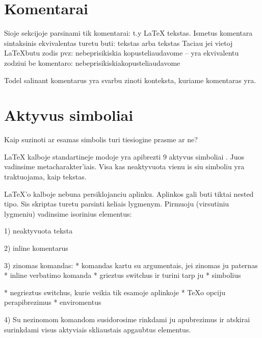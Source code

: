 \documentclass{article}
\begin{document}
\section{Komentarai}
Sioje sekcijoje parsinami tik komentarai:
t.y \LaTeX%
   tekstas. Ismetus komentara sintaksinis ekvivalentas turetu buti: \LateX tekstas arba \LateX{}tekstas  
Taciau jei vietoj \LaTeX butu zodis pvz: nebeprisikiskia%
          kopusteliaudavome -- yra ekvivalentu zodziui be komentaro: nebeprisikiskiakopusteliaudavome

Todel salinant komentarus yra svarbu zinoti konteksta, kuriame komentaras yra. 

\section{Aktyvus simboliai}
Kaip suzinoti ar esamas simbolis turi tiesiogine prasme ar ne?

LaTeX kalboje standartineje modoje yra apibrezti 9
aktyvus simboliai %
. Juos vadinsime metacharakter'iais. Visa kas neaktyvuota vienu is siu 
simboliu yra traktuojama, kaip tekstas. 

LaTeX'o kalboje nebuna persiklojanciu aplinku. %
Aplinkos gali buti tiktai nested tipo. %
Sis skriptas turetu parsinti keliais lygmenym. Pirmuoju (virsutiniu lygmeniu) 
vadinsime isorinius elementus: 

1) neaktyvuota teksta

2) inline komentarus

3) zinomas komandas:
* komandas kartu su argumentais, jei zinomas ju paternas %
* inline verbatimo komanda %
* grieztus switchus ir turini tarp ju %
* simbolius %

* negrieztus switchus, kurie veikia tik esamoje aplinkoje %
* TeXo opciju perapibrezimus %
* enviromentus

4) Su nezinomom komandom susidorosime rinkdami ju apubrezimus ir atskirai
surinkdami visus aktyviais skliaustais %
apgaubtus elementus.
\end{document}
